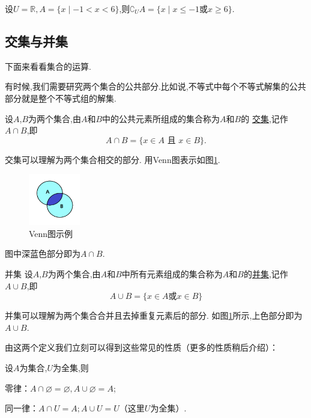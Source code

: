 \documentclass[lang=cn,math=cm,chinesefont=nofont,11pt,scheme=chinese,twocol]{elegantbook}
\begin{document}
\begin{example}
  设$U=\mathbb{R},A=\{x\mid -1<x<6\}$,则$\complement_{U}A=\{x\mid x\leq -1\text{或}x\geq 6\}.$
\end{example}

\subsection{交集与并集}

下面来看看集合的运算.

有时候,我们需要研究两个集合的公共部分.比如说,不等式中每个不等式解集的公共部分就是整个不等式组的解集.

\begin{definition}[交集]
  设$A$,$B$为两个集合,由$A$和$B$中的公共元素所组成的集合称为$A$和$B$的
  \underline{交集},记作$A\cap B$,即$$A\cap B=\{x\in A\text{ 且 }x\in B\}.$$
\end{definition}

交集可以理解为两个集合相交的部分.
用Venn图表示如图\ref{img:Venn2}.
  \begin{figure}[h]
    \centering
    \includegraphics[width=0.2\textwidth]{image/Venn2.png}
    \caption{Venn图示例}
    \label{img:Venn2}
  \end{figure}
  图中深蓝色部分即为$A\cap B$.

\begin{definition}{并集}
  设$A$,$B$为两个集合,由$A$和$B$中所有元素组成的集合称为$A$和$B$的\underline{并集},记作$A\cup B$,即
  $$A\cup B=\{x\in A\text{或}x\in B\}$$
\end{definition}

并集可以理解为两个集合合并且去掉重复元素后的部分.
如图\ref{img:Venn2}所示,上色部分即为$A\cup B$. 

由这两个定义我们立刻可以得到这些常见的性质（更多的性质稍后介绍）：

设$A$为集合,$U$为全集,则

\begin{property}
  零律：$A\cap\varnothing =\varnothing,A\cup\varnothing=A$;
\end{property}

\begin{property}
  同一律：$A\cap U=A;A\cup U=U$（这里$U$为全集）.
\end{property}
\end{document}
